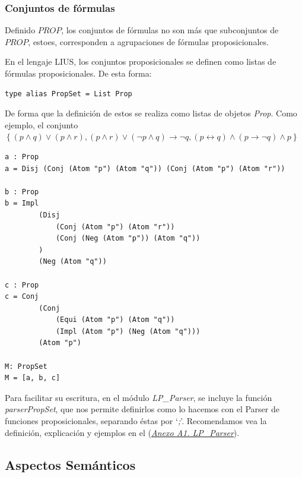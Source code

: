\documentclass[a4paper]{report}
\begin{document}
\subsubsection{Conjuntos de fórmulas}

Definido $PROP$, los conjuntos de fórmulas no son más que subconjuntos de $PROP$, estoes, corresponden a agrupaciones de fórmulas proposicionales. 

En el lengaje LIUS, los conjuntos proposicionales se definen como listas de fórmulas proposicionales. De esta forma: \\

\begin{lstlisting}[caption= Definición de Conjunto de Fórmulas como Lista de Fórmulas Proposicionales]
type alias PropSet = List Prop
\end{lstlisting}

De forma que la definición de estos se realiza como listas de objetos \textit{Prop}. Como ejemplo, el conjunto $ \left\lbrace (p \wedge q) \vee (p \wedge r), (p \wedge r) \vee (\neg p \wedge q) \rightarrow \neg q, (p \leftrightarrow q) \wedge (p \rightarrow \neg q) \wedge p \right\rbrace$\\


\begin{lstlisting}[caption= {Ejemplo de definición de conjuntos proposicionales.}]
a : Prop
a = Disj (Conj (Atom "p") (Atom "q")) (Conj (Atom "p") (Atom "r"))
 
b : Prop   
b = Impl 
        (Disj 
            (Conj (Atom "p") (Atom "r")) 
            (Conj (Neg (Atom "p")) (Atom "q"))
        ) 
        (Neg (Atom "q"))

c : Prop
c = Conj 
        (Conj 
            (Equi (Atom "p") (Atom "q")) 
            (Impl (Atom "p") (Neg (Atom "q"))) 
        (Atom "p")

M: PropSet      
M = [a, b, c]
\end{lstlisting}

Para facilitar su escritura, en el módulo \textit{LP\_Parser}, se incluye la función \textit{parserPropSet}, que nos permite definirlos como lo hacemos con el Parser de funciones proposicionales, separando éstas por `\textit{;}'. Recomendamos vea la definición, explicación y ejemplos en el (\hyperref[sec:A1.LPParser]{\textit{\underline{Anexo A1. LP\_Parser}}}).

\subsection{Aspectos Semánticos}
\end{document}

